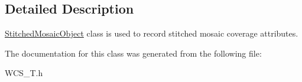 \subsection{Detailed Description}
\hyperlink{classStitchedMosaicObject}{StitchedMosaicObject} class is used to record stitched mosaic coverage attributes. 

The documentation for this class was generated from the following file:\begin{DoxyCompactItemize}
\item 
WCS\_\-T.h\end{DoxyCompactItemize}
